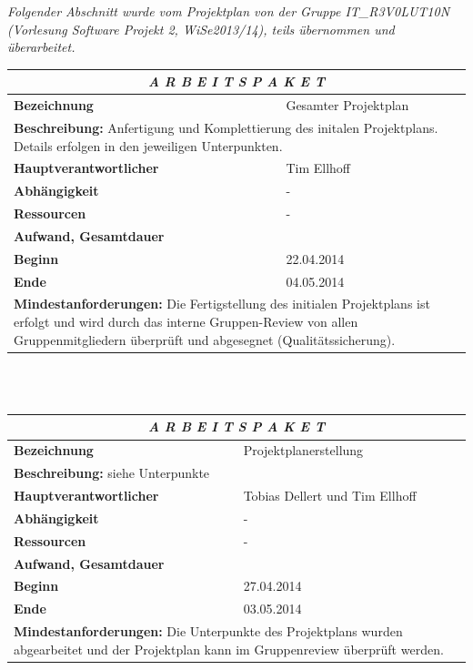 \documentclass[fontsize=12pt,paper=a4,twoside]{scrartcl}
\begin{document}
\textit{Folgender Abschnitt wurde vom Projektplan von der Gruppe IT\_R3V0LUT10N (Vorlesung Software Projekt 2, WiSe2013/14), teils übernommen und überarbeitet.}


\begin{tabular}{p{7.5cm}|p{7.5cm}}\toprule
\multicolumn{2}{c}{\textbf{\textit{A R B E I T S P A K E T \quad 1}}} \\ \toprule \hline
\textbf{Bezeichnung} & Gesamter Projektplan\\\hline
\multicolumn{2}{p{15cm}}{\textbf{Beschreibung:} \newline 
Anfertigung und Komplettierung des initalen Projektplans. Details erfolgen in den jeweiligen Unterpunkten.}  \\\hline
\textbf{Hauptverantwortlicher} & Tim Ellhoff\\\hline
\textbf{Abhängigkeit} & -\\\hline
\textbf{Ressourcen} & -\\\hline
\textbf{Aufwand, Gesamtdauer} & \\\hline
\textbf{Beginn} & 22.04.2014 \\\hline
\textbf{Ende} & 04.05.2014\\\hline
\multicolumn{2}{p{15cm}}{\textbf{Mindestanforderungen: } \newline
Die Fertigstellung des initialen Projektplans ist erfolgt und wird durch das interne Gruppen-Review von allen Gruppenmitgliedern überprüft und abgesegnet (Qualitätssicherung).}  \\ \toprule
\end{tabular} \\\\

\begin{tabular}{p{7.5cm}|p{7.5cm}}\toprule
\multicolumn{2}{c}{\textbf{\textit{A R B E I T S P A K E T \quad 1.1}}} \\ \toprule \hline
\textbf{Bezeichnung} & Projektplanerstellung\\\hline
\multicolumn{2}{p{15cm}}{\textbf{Beschreibung:} \newline 
siehe Unterpunkte}  \\\hline
\textbf{Hauptverantwortlicher} & Tobias Dellert und Tim Ellhoff\\\hline
\textbf{Abhängigkeit} & -\\\hline
\textbf{Ressourcen} & -\\\hline
\textbf{Aufwand, Gesamtdauer} & \\\hline
\textbf{Beginn} & 27.04.2014 \\\hline
\textbf{Ende} & 03.05.2014\\\hline
\multicolumn{2}{p{15cm}}{\textbf{Mindestanforderungen: } \newline
Die Unterpunkte des Projektplans wurden abgearbeitet und der Projektplan kann im Gruppenreview überprüft werden.}  \\ \toprule
\end{tabular} \\\\
\end{document}
